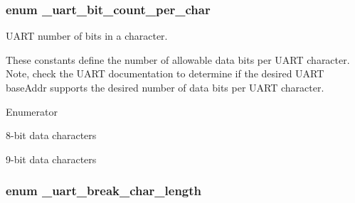 \subsubsection[{\texorpdfstring{\+\_\+uart\+\_\+bit\+\_\+count\+\_\+per\+\_\+char}{_uart_bit_count_per_char}}]{\setlength{\rightskip}{0pt plus 5cm}enum {\bf \+\_\+uart\+\_\+bit\+\_\+count\+\_\+per\+\_\+char}}\hypertarget{group__uart__hal_ga09ceaf514baf3352c6c4a78155cbfd9d}{}\label{group__uart__hal_ga09ceaf514baf3352c6c4a78155cbfd9d}


U\+A\+RT number of bits in a character. 

These constants define the number of allowable data bits per U\+A\+RT character. Note, check the U\+A\+RT documentation to determine if the desired U\+A\+RT base\+Addr supports the desired number of data bits per U\+A\+RT character. \begin{Desc}
\item[Enumerator]\par
\begin{description}
\item[{\em 
k\+Uart8\+Bits\+Per\+Char\hypertarget{group__uart__hal_gga09ceaf514baf3352c6c4a78155cbfd9da39a5492922c7775dd7e0ad0cc394d9c7}{}\label{group__uart__hal_gga09ceaf514baf3352c6c4a78155cbfd9da39a5492922c7775dd7e0ad0cc394d9c7}
}]8-\/bit data characters \item[{\em 
k\+Uart9\+Bits\+Per\+Char\hypertarget{group__uart__hal_gga09ceaf514baf3352c6c4a78155cbfd9da4c94ddc92496671dcc07f56665c423ab}{}\label{group__uart__hal_gga09ceaf514baf3352c6c4a78155cbfd9da4c94ddc92496671dcc07f56665c423ab}
}]9-\/bit data characters \end{description}
\end{Desc}
\subsubsection[{\texorpdfstring{\+\_\+uart\+\_\+break\+\_\+char\+\_\+length}{_uart_break_char_length}}]{\setlength{\rightskip}{0pt plus 5cm}enum {\bf \+\_\+uart\+\_\+break\+\_\+char\+\_\+length}}\hypertarget{group__uart__hal_gafc836c7460339592ca74ec409835dabb}{}\label{group__uart__hal_gafc836c7460339592ca74ec409835dabb}


